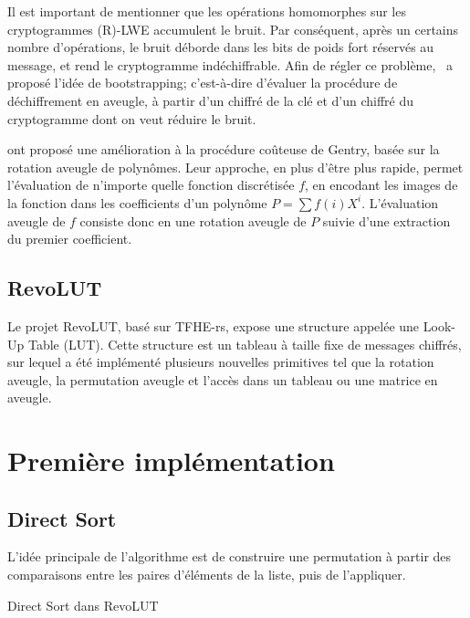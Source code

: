 \documentclass{article}
\begin{document}
Il est important de mentionner que les opérations homomorphes sur les cryptogrammes (R)-LWE accumulent le bruit. Par conséquent, après un certains nombre d'opérations, le bruit déborde dans les bits de poids fort réservés au message, et rend le cryptogramme indéchiffrable. Afin de régler ce problème,~\cite{gentry_fully_2009} a proposé l'idée de bootstrapping; c'est-à-dire d'évaluer la procédure de déchiffrement en aveugle, à partir d'un chiffré de la clé et d'un chiffré du cryptogramme dont on veut réduire le bruit.

\cite{chillotti_tfhe_2020} ont proposé une amélioration à la procédure coûteuse de Gentry, basée sur la rotation aveugle de polynômes. Leur approche, en plus d'être plus rapide, permet l'évaluation de n'importe quelle fonction discrétisée $f$, en encodant les images de la fonction dans les coefficients d'un polynôme $P = \sum{f(i)X^i}$. L'évaluation aveugle de $f$ consiste donc en une rotation aveugle de $P$ suivie d'une extraction du premier coefficient.

\subsection{RevoLUT}

Le projet RevoLUT, basé sur TFHE-rs, expose une structure appelée une Look-Up Table (LUT). Cette structure est un tableau à taille fixe de messages chiffrés, sur lequel a été implémenté plusieurs nouvelles primitives tel que la rotation aveugle, la permutation aveugle et l'accès dans un tableau ou une matrice en aveugle.

\newpage

\section{Première implémentation}

\subsection{Direct Sort}

L'idée principale de l'algorithme est de construire une permutation à partir des comparaisons entre les paires d'éléments de la liste, puis de l'appliquer.

\begin{algorithm}
    \caption{Direct Sort dans RevoLUT}
    \begin{algorithmic}
            \State{$\sigma \gets [0; n]$}
                \EndFor{}
            \EndFor{}

        \EndFunction{}
    \end{algorithmic}
\end{algorithm}
\end{document}
